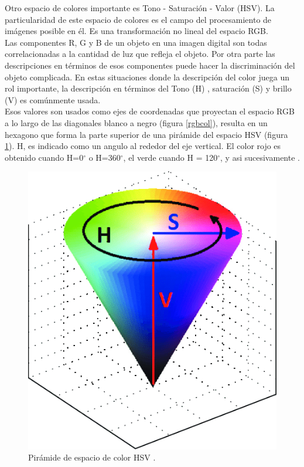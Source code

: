 \documentclass[twoside,spanish,ESP,MSc]{plantillaLabUPV}
\theoremstyle{definition}
\begin{document}
Otro espacio de colores importante es Tono - Saturación - Valor (HSV). La particularidad de este espacio de colores es el campo del procesamiento de imágenes posible en él. Es una transformación no lineal del espacio RGB.\\

Las componentes R, G y B de un objeto en una imagen digital son todas correlacionadas a la cantidad de luz que refleja el objeto. Por otra parte las descripciones en términos de esos componentes puede hacer la discriminación del objeto complicada. En estas situaciones donde la descripción del color juega un rol importante, la descripción en términos del Tono (H) , saturación (S) y brillo (V) es comúnmente usada.\\

Esos valores son usados como ejes de coordenadas que proyectan el espacio RGB a lo largo de las diagonales blanco a negro (figura \ref{rgbcol}), resulta en un hexagono que forma la parte superior de una pirámide del espacio HSV (figura \ref{hsvcol}). H, es indicado como un angulo al rededor del eje vertical. El color rojo es obtenido cuando H=0$^{\circ}$ o H=360$^{\circ}$, el verde cuando H = 120$^{\circ}$, y asi sucesivamente \cite{Koschan:2008:DCI:1370941}.

\begin{figure}[h] 
	\centering 
		\includegraphics[scale=.35]{ima/hsvcol} 
	\caption{Pirámide de espacio de color HSV \cite{hsvspace}.} 
	\label{hsvcol} 
\end{figure}
\end{document}

